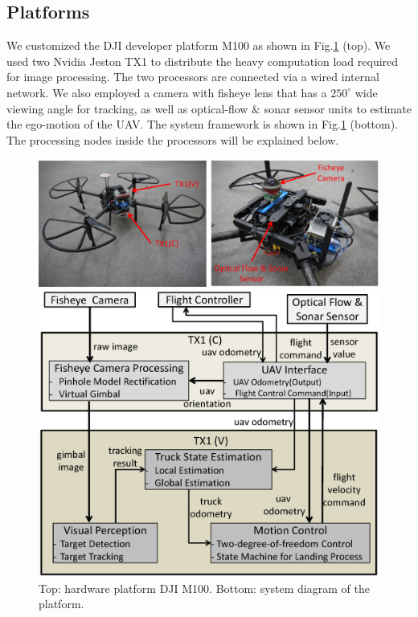 \documentclass{standalone}
\begin{document}
\subsection{Platforms}
We customized the DJI developer platform M100 as shown in Fig.\ref{figure:task1-platform} (top). We used two Nvidia Jeston TX1 to distribute the heavy computation load required for image processing. The two processors are connected via a wired internal network.
We also employed a camera with fisheye lens that has a $250^\circ$ wide viewing angle for tracking, as well as optical-flow $\&$ sonar sensor units to estimate the ego-motion of the UAV. The system framework is shown in Fig.\ref{figure:task1-platform} (bottom). The processing nodes inside the processors will be explained below.

\begin{figure}[h]
    \begin{center}
        \begin{minipage}{\hsize}
          \begin{center}
      \includegraphics[clip, bb= 0 0 700 260, width=\columnwidth]{sections/task1/images/task1_hardware.eps}
          \end{center}
        \end{minipage}
        \begin{minipage}{1.0\hsize}
          \begin{center}
      \includegraphics[clip, bb= 0 0 525 440, width=0.9\columnwidth]{sections/task1/images/task1_framework.eps}
          \end{center}
        \end{minipage}
    \end{center}
    \caption{Top: hardware platform DJI M100. Bottom: system diagram of the platform.}
    \label{figure:task1-platform}
\end{figure}
\end{document}
